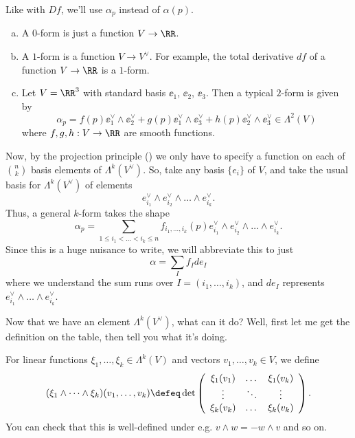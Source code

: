 \documentclass[11pt]{scrreprt}
\begin{document}
Like with $Df$, we'll use $\alpha_p$ instead of $\alpha(p)$.

\begin{example}
	[$k$-forms for $k=0,1$]
	\listhack
	\begin{enumerate}[(a)]
		\item A $0$-form is just a function $V \to \RR$.
		\item A $1$-form is a function $V \to V^\vee$.
		For example, the total derivative $df$ of a function $V \to \RR$ is a $1$-form.
		\item Let $V = \RR^3$ with standard basis $\ee_1$, $\ee_2$, $\ee_3$.
		Then a typical $2$-form is given by
		\[
			\alpha_p
			=
			f(p) \ee_1^\vee \wedge \ee_2^\vee
			+ g(p) \ee_1^\vee \wedge \ee_3^\vee
			+ h(p) \ee_2^\vee \wedge \ee_3^\vee
			\in \Lambda^2(V)
		\]
		where $f,g,h : V \to \RR$ are smooth functions.
	\end{enumerate}
\end{example}

Now, by the projection principle () we only have to specify
a function on each of $\binom nk$ basis elements of $\Lambda^k(V^\vee)$.
So, take any basis $\{e_i\}$ of $V$, and 
take the usual basis for $\Lambda^k(V^\vee)$ of elements
\[ e_{i_1}^\vee \wedge e_{i_2}^\vee \wedge \dots \wedge e_{i_k}^\vee. \]
Thus, a general $k$-form takes the shape
\[ \alpha_p = \sum_{1 \le i_1 < \dots < i_k \le n} 
	f_{i_1, \dots, i_k}(p)
	e_{i_1}^\vee \wedge e_{i_2}^\vee \wedge \dots \wedge e_{i_k}^\vee. \]
Since this is a huge nuisance to write, we will abbreviate this to just
\[ \alpha = \sum_I f_I de_I \]
where we understand the sum runs over $I = (i_1, \dots, i_k)$,
and $de_I$ represents $e_{i_1}^\vee \wedge \dots \wedge e_{i_k}^\vee$.

Now that we have an element $\Lambda^k(V^\vee)$, what can it do?
Well, first let me get the definition on the table, then tell you what it's doing.
\begin{definition}
	For linear functions $\xi_1, \dots, \xi_k \in \Lambda^k(V)$
	and vectors $v_1, \dots, v_k \in V$, we define
	\[
		(\xi_1 \wedge \dots \wedge \xi_k)(v_1, \dots, v_k)
		\defeq
		\det
		\left(
		\begin{array}{ccc}
			\xi_1(v_1) & \dots & \xi_1(v_k) \\
			\vdots & \ddots & \vdots \\
			\xi_k(v_k) & \dots & \xi_k(v_k)
		\end{array}
		\right).
	\]
	You can check that this is well-defined
	under e.g. $v \wedge w = -w \wedge v$ and so on.
\end{definition}
\end{document}
